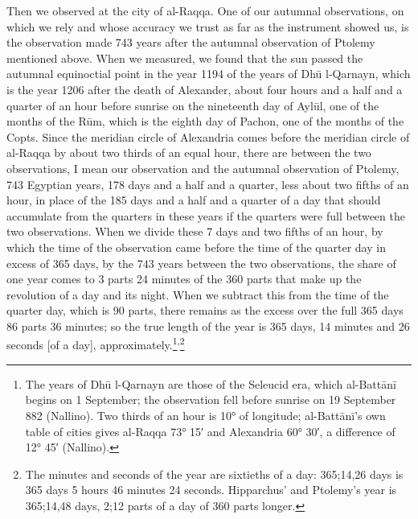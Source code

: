 \documentclass[11pt]{article}
\newcommand{\ArPage}[1]{\marginpar{\footnotesize\color{gray}Ar.\,p.\,#1}}
\begin{document}
\par \ArPage{64}Then we observed at the city of al-Raqqa. One of our autumnal observations, on which we rely and whose accuracy we trust as far as the instrument showed us, is the observation made 743 years after the autumnal observation of Ptolemy mentioned above. When we measured, we found that the sun passed the autumnal equinoctial point in the year 1194 of the years of Dhū l-Qarnayn, which is the year 1206 after the death of Alexander, about four hours and a half and a quarter of an hour before sunrise on the nineteenth day of Aylūl, one of the months of the Rūm, which is the eighth day of Pachon, one of the months of the Copts. Since the meridian circle of Alexandria comes before the meridian circle of al-Raqqa by about two thirds of an equal hour, there are between the two observations, I mean our observation and the autumnal observation of Ptolemy, 743 Egyptian years, 178 days and a half and a quarter, less about two fifths of an hour, in place of the 185 days and a half and a quarter of a day that should accumulate from the quarters in these years if the quarters were full between the two observations. When we divide these 7 days and two fifths of an hour, by which the time of the observation came before the time of the quarter day in excess of 365 days, by the 743 years between the two observations, the share of one year comes to 3 parts 24 minutes of the 360 parts that make up the revolution of a day and its night. When we subtract this from the time of the quarter day, which is 90 parts, there remains as the excess over the full 365 days 86 parts 36 minutes; so the true length of the year is 365 days, 14 minutes and 26 seconds [of a day], approximately.\footnote{The years of Dhū l-Qarnayn are those of the Seleucid era, which al-Battānī begins on 1 September; the observation fell before sunrise on 19 September 882 (Nallino). Two thirds of an hour is 10° of longitude; al-Battānī's own table of cities gives al-Raqqa 73° 15′ and Alexandria 60° 30′, a difference of 12° 45′ (Nallino).}\textsuperscript{,}\footnote{The minutes and seconds of the year are sixtieths of a day: 365;14,26 days is 365 days 5 hours 46 minutes 24 seconds. Hipparchus' and Ptolemy's year is 365;14,48 days, 2;12 parts of a day of 360 parts longer.}\par
\end{document}

